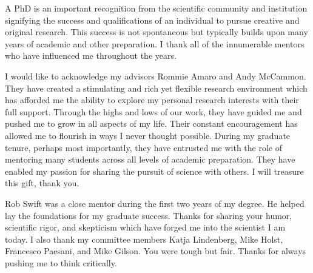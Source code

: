 \begin{frontmatter}
%


%
\tableofcontents

\listoffigures  %
\listoftables   %
\listofalgorithms

%
%
\begin{acknowledgements}
\par A PhD is an important recognition from the scientific community and institution signifying the success and qualifications of an individual to pursue creative and original research.
This success is not spontaneous but typically builds upon many years of academic and other preparation.
I thank all of the innumerable mentors who have influenced me throughout the years.

\par I would like to acknowledge my advisors Rommie Amaro and Andy McCammon.
They have created a stimulating and rich yet flexible research environment which has afforded me the ability to explore my personal research interests with their full support.
Through the highs and lows of our work, they have guided me and pushed me to grow in all aspects of my life.
Their constant encouragement has allowed me to flourish in ways I never thought possible.
During my graduate tenure, perhaps most importantly, they have entrusted me with the role of mentoring many students across all levels of academic preparation.
They have enabled my passion for sharing the pursuit of science with others.
I will treasure this gift, thank you.

\par Rob Swift was a close mentor during the first two years of my degree.
He helped lay the foundations for my graduate success.
Thanks for sharing your humor, scientific rigor, and skepticism which have forged me into the scientist I am today.
I also thank my committee members Katja Lindenberg, Mike Holst, Francesco Paesani, and Mike Gilson.
You were tough but fair. Thanks for always pushing me to think critically.


\end{acknowledgements}
\end{frontmatter}
